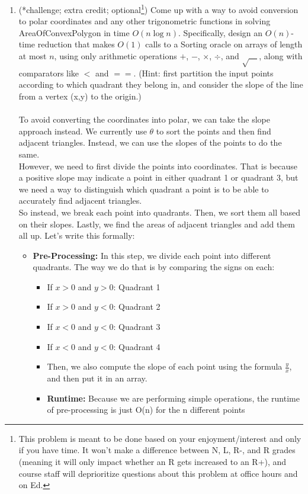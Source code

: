 \documentclass[11pt]{article}
\begin{document}
\begin{enumerate}
\begin{enumerate}
        \item (*challenge; extra credit; optional\footnote{This problem is meant to be done based on your enjoyment/interest and only if you have time. It won't make a difference between N, L, R-, and R grades (meaning it will only impact whether an R gets increased to an R+), and course staff will deprioritize questions about this problem at office hours and on Ed.})  Come up with a way to avoid conversion to polar coordinates and any other trigonometric functions in solving AreaOfConvexPolygon in time $O(n\log n)$.  Specifically, design an $O(n)$-time reduction that makes $O(1)$ calls to a Sorting oracle on arrays of length at most $n$, using only arithmetic operations $+$, $-$, $\times$, $\div$, and $\sqrt{\hspace{1em}}$, along with comparators like $<$ and $==$.  (Hint: first partition the input points according to which quadrant they belong in, and consider the slope of the line from a vertex (x,y) to the origin.) 
        \\\\ To avoid converting the coordinates into polar, we can take the slope approach instead. We currently use $\theta$ to sort the points and then find adjacent triangles. Instead, we can use the slopes of the points to do the same. 
        \\ However, we need to first divide the points into coordinates. That is because a positive slope may indicate a point in either quadrant 1 or quadrant 3, but we need a way to distinguish which quadrant a point is to be able to accurately find adjacent triangles.
        \\ So instead, we break each point into quadrants. Then, we sort them all based on their slopes. Lastly, we find the areas of adjacent triangles and add them all up. Let's write this formally:
        \begin{itemize}
            \item \textbf{Pre-Processing:} In this step, we divide each point into different quadrants. The way we do that is by comparing the signs on each:
            \begin{itemize}
                \item If $x > 0$ and $y > 0$: Quadrant 1
                \item If $x > 0$ and $y < 0$: Quadrant 2
                \item If $x < 0$ and $y < 0$: Quadrant 3
                \item If $x < 0$ and $y < 0$: Quadrant 4
                \item Then, we also compute the slope of each point using the formula $\frac{y}{x}$, and then put it in an array.
                \item \textbf{Runtime:} Because we are performing simple operations, the runtime of pre-processing is just O(n) for the n different points
            \end{itemize}


\end{itemize}
\end{enumerate}
\end{enumerate}
\end{document}
